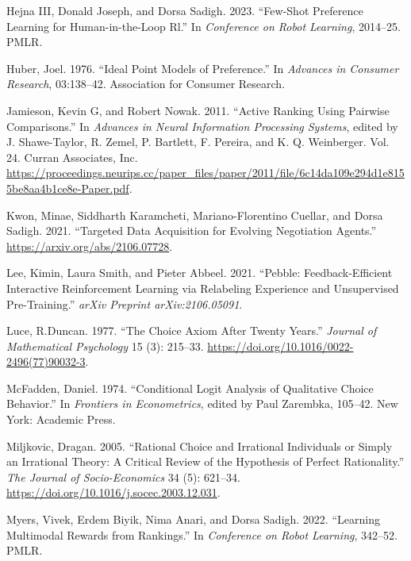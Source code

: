 \documentclass[
  letterpaper,
  numbers=noenddot,
  DIV=11]{scrreprt}
\newlength{\cslhangindent}
\newenvironment{CSLReferences}[2] %
 {\begin{list}{}{%
  \setlength{\itemindent}{0pt}
  \setlength{\leftmargin}{0pt}
  \setlength{\parsep}{0pt}
  \ifodd #1
   \setlength{\leftmargin}{\cslhangindent}
   \setlength{\itemindent}{-1\cslhangindent}
  \fi
  \setlength{\itemsep}{#2\baselineskip}}}
 {\end{list}}
\theoremstyle{plain}
\theoremstyle{definition}
\theoremstyle{remark}
\begin{document}
\begin{CSLReferences}{1}{0}
Hejna III, Donald Joseph, and Dorsa Sadigh. 2023. {``Few-Shot Preference
Learning for Human-in-the-Loop Rl.''} In \emph{Conference on Robot
Learning}, 2014--25. PMLR.

Huber, Joel. 1976. {``Ideal Point Models of Preference.''} In
\emph{Advances in Consumer Research}, 03:138--42. Association for
Consumer Research.

Jamieson, Kevin G, and Robert Nowak. 2011. {``Active Ranking Using
Pairwise Comparisons.''} In \emph{Advances in Neural Information
Processing Systems}, edited by J. Shawe-Taylor, R. Zemel, P. Bartlett,
F. Pereira, and K. Q. Weinberger. Vol. 24. Curran Associates, Inc.
\url{https://proceedings.neurips.cc/paper_files/paper/2011/file/6c14da109e294d1e8155be8aa4b1ce8e-Paper.pdf}.

Kwon, Minae, Siddharth Karamcheti, Mariano-Florentino Cuellar, and Dorsa
Sadigh. 2021. {``Targeted Data Acquisition for Evolving Negotiation
Agents.''} \url{https://arxiv.org/abs/2106.07728}.

Lee, Kimin, Laura Smith, and Pieter Abbeel. 2021. {``Pebble:
Feedback-Efficient Interactive Reinforcement Learning via Relabeling
Experience and Unsupervised Pre-Training.''} \emph{arXiv Preprint
arXiv:2106.05091}.

Luce, R.Duncan. 1977. {``The Choice Axiom After Twenty Years.''}
\emph{Journal of Mathematical Psychology} 15 (3): 215--33.
\url{https://doi.org/10.1016/0022-2496(77)90032-3}.

McFadden, Daniel. 1974. {``Conditional Logit Analysis of Qualitative
Choice Behavior.''} In \emph{Frontiers in Econometrics}, edited by Paul
Zarembka, 105--42. New York: Academic Press.

Miljkovic, Dragan. 2005. {``Rational Choice and Irrational Individuals
or Simply an Irrational Theory: A Critical Review of the Hypothesis of
Perfect Rationality.''} \emph{The Journal of Socio-Economics} 34 (5):
621--34. \url{https://doi.org/10.1016/j.socec.2003.12.031}.

Myers, Vivek, Erdem Biyik, Nima Anari, and Dorsa Sadigh. 2022.
{``Learning Multimodal Rewards from Rankings.''} In \emph{Conference on
Robot Learning}, 342--52. PMLR.


\end{CSLReferences}
\end{document}
